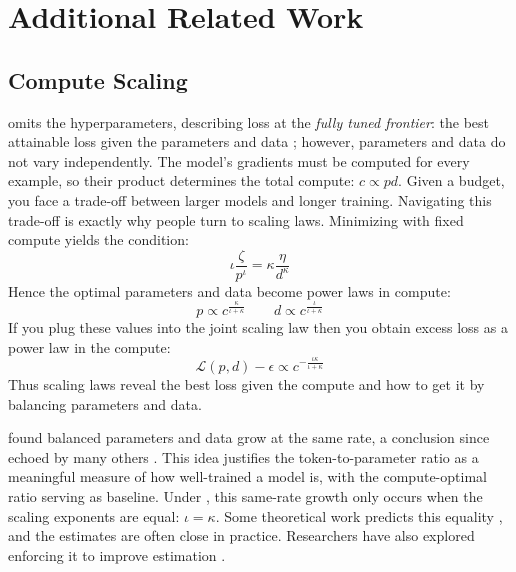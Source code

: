 \section{Additional Related Work}
\label{sec:related-work}

\subsection{Compute Scaling}\label{app:scaling-laws}

  omits the hyperparameters, describing loss at the \emph{fully tuned frontier}: the best attainable loss given the parameters and data 
; however, parameters and data do not vary independently. The model's gradients must be computed for every example, so their product determines the total compute: $c \propto p d$.
Given a budget, you face a trade-off between larger models and longer training. Navigating this trade-off is exactly why people turn to scaling laws. Minimizing  with fixed compute yields the condition:
%
\begin{equation}\label{eq:compute-optimality-condition}
    \iota \frac{\zeta}{p^\iota} = \kappa \frac{\eta}{d^\kappa}
\end{equation}
%
Hence the optimal parameters and data become power laws in compute:
%
\begin{equation}\label{eq:compute-optimal-parameters-and-data}
    p \propto c^{\frac{\kappa}{\iota + \kappa}} \qquad d \propto c^{\frac{\iota}{\iota + \kappa}}
\end{equation}
%
If you plug these values into the joint scaling law then you obtain excess loss as a power law in the compute:
%
\begin{equation}\label{eq:scaling-law_compute}
    \mathcal{L}(p, d) - \epsilon \propto c^{-\frac{\iota\kappa}{\iota + \kappa}}
\end{equation}
%
Thus scaling laws reveal the best loss given the compute and how to get it by balancing parameters and data.

\citet{Hoffmann2022AnEmpirical} found balanced parameters and data grow at the same rate, a conclusion since echoed by many others \citep{anil2023palm2technicalreport, deepseekai2024deepseekllmscalingopensource}. This idea justifies the token-to-parameter ratio as a meaningful measure of how well-trained a model is, with the compute-optimal ratio serving as baseline. Under , this same-rate growth only occurs when the scaling exponents are equal: $\iota = \kappa$. Some theoretical work predicts this equality \citep{Bahri2024Explaining}, and the estimates are often close in practice. Researchers have also explored enforcing it to improve estimation \citep{Muennighoff2025Scaling, li2025misfitting}.


